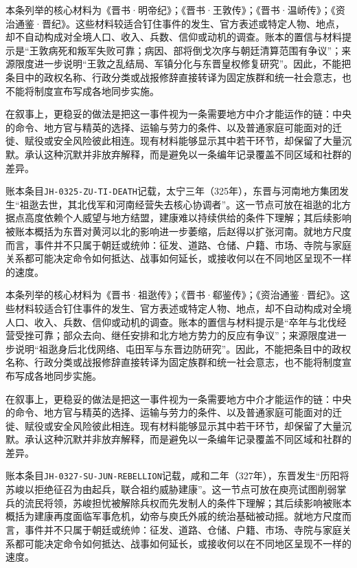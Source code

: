 本条列举的核心材料为《晋书·明帝纪》；《晋书·王敦传》；《晋书·温峤传》；《资治通鉴·晋纪》。这些材料较适合钉住事件的发生、官方表述或特定人物、地点，却不自动构成对全境人口、收入、兵数、信仰或动机的调查。账本的置信与材料提示是“王敦病死和叛军失败可靠；病因、部将倒戈次序与朝廷清算范围有争议”；来源限度进一步说明“王敦之乱结局、军镇分化与东晋皇权修复研究”。因此，不能把条目中的政权名称、行政分类或战报修辞直接转译为固定族群和统一社会意志，也不能将制度宣布写成各地同步实施。

在叙事上，更稳妥的做法是把这一事件视为一条需要地方中介才能运作的链：中央的命令、地方官与精英的选择、运输与劳力的条件、以及普通家庭可能面对的迁徙、赋役或安全风险彼此相连。现有材料能够显示其中若干环节，却保留了大量沉默。承认这种沉默并非放弃解释，而是避免以一条编年记录覆盖不同区域和社群的差异。

账本条目\texttt{JH-0325-ZU-TI-DEATH}记载，太宁三年（325年），东晋与河南地方集团发生“祖逖去世，其北伐军和河南经营失去核心协调者”。这一节点可放在祖逖的北方据点高度依赖个人威望与地方结盟，建康难以持续供给的条件下理解；其后续影响被账本概括为东晋对黄河以北的影响进一步萎缩，后赵得以扩张河南。就地方尺度而言，事件并不只属于朝廷或统帅：征发、道路、仓储、户籍、市场、寺院与家庭关系都可能决定命令如何抵达、战事如何延长，或接收何以在不同地区呈现不一样的速度。

本条列举的核心材料为《晋书·祖逖传》；《晋书·郗鉴传》；《资治通鉴·晋纪》。这些材料较适合钉住事件的发生、官方表述或特定人物、地点，却不自动构成对全境人口、收入、兵数、信仰或动机的调查。账本的置信与材料提示是“卒年与北伐经营受挫可靠；部众去向、继任安排和北方地方势力的反应有争议”；来源限度进一步说明“祖逖身后北伐网络、屯田军与东晋边防研究”。因此，不能把条目中的政权名称、行政分类或战报修辞直接转译为固定族群和统一社会意志，也不能将制度宣布写成各地同步实施。

在叙事上，更稳妥的做法是把这一事件视为一条需要地方中介才能运作的链：中央的命令、地方官与精英的选择、运输与劳力的条件、以及普通家庭可能面对的迁徙、赋役或安全风险彼此相连。现有材料能够显示其中若干环节，却保留了大量沉默。承认这种沉默并非放弃解释，而是避免以一条编年记录覆盖不同区域和社群的差异。

账本条目\texttt{JH-0327-SU-JUN-REBELLION}记载，咸和二年（327年），东晋发生“历阳将苏峻以拒绝征召为由起兵，联合祖约威胁建康”。这一节点可放在庾亮试图削弱掌兵的流民将领，苏峻担忧被解除兵权而先发制人的条件下理解；其后续影响被账本概括为建康再度面临军事危机，幼帝与庾氏外戚的统治基础被动摇。就地方尺度而言，事件并不只属于朝廷或统帅：征发、道路、仓储、户籍、市场、寺院与家庭关系都可能决定命令如何抵达、战事如何延长，或接收何以在不同地区呈现不一样的速度。

